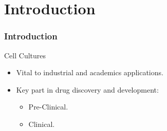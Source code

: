 \section{Introduction}


\begin{frame}{}
    \frametitle{Introduction}
\end{frame}


\begin{frame}{Cell Cultures}
    \begin{itemize}
        \item Vital to industrial and academics applications.
        \item Key part in drug discovery and development:
        \begin{itemize}
            \item Pre-Clinical.
            \item Clinical.
        \end{itemize}
    \end{itemize}
\end{frame}

